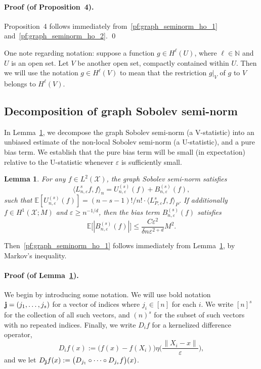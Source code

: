 \documentclass[aos]{imsart}
\theoremstyle{plain}
\newtheorem{lemma}{Lemma}
\theoremstyle{definition}
\theoremstyle{remark}
\newcommand{\dotp}[2]{\langle #1, #2 \rangle}
\newcommand{\mc}[1]{\mathcal{#1}}
\newcommand{\1}{\mathbf{1}}
\newcommand{\bj}{{\bf j}}
\newcommand{\restr}[2]{\ensuremath{\left.#1\right|_{#2}}}
\begin{document}
\paragraph{Proof (of Proposition~4).}
Proposition~4 follows immediately from~\eqref{pf:graph_seminorm_ho_1} and~\eqref{pf:graph_seminorm_ho_2}. \qed

One note regarding notation: suppose a function $g \in H^{\ell}(U)$, where $\ell \in \mathbb{N}$ and $U$ is an open set. Let $V$ be another open set, compactly contained within $U$. Then we will use the notation $g \in H^{\ell}(V)$ to mean that the restriction $\restr{g}{V}$ of $g$ to $V$ belongs to $H^{\ell}(V)$.

\subsection{Decomposition of graph Sobolev semi-norm}
\label{subsec:decomposition_graph_seminorm}

In Lemma~\ref{lem:graph_seminorm_bias}, we decompose the graph Sobolev semi-norm (a V-statistic) into an unbiased estimate of the non-local Sobolev semi-norm (a U-statistic), and a pure bias term. We establish that the pure bias term will be small (in expectation) relative to the U-statistic whenever $\varepsilon$ is sufficiently small.
\begin{lemma}
	\label{lem:graph_seminorm_bias}
	For any $f \in L^2(\mc{X})$, the graph Sobolev semi-norm satisfies
	\begin{equation}
	\label{eqn:graph_seminorm_bias_1}
	\dotp{L_{n,\varepsilon}^sf}{f}_{n} = U_{n,\varepsilon}^{(s)}(f) + B_{n,\varepsilon}^{(s)}(f),
	\end{equation}
	such that $\mathbb{E}[U_{n,\varepsilon}^{(s)}(f)] = (n - s - 1)!/n! \cdot \dotp{L_{P,\varepsilon}^sf}{f}_P$. If additionally $f \in H^1(\mc{X};M)$ and $\varepsilon \geq n^{-1/d}$, then the bias term $B_{n,\varepsilon}^{(s)}(f)$ satisfies
	\begin{equation}
	\label{eqn:graph_seminorm_bias_2}
	\mathbb{E}\bigl[|B_{n,\varepsilon}^{(s)}(f)|\bigr] \leq \frac{C\varepsilon^2}{\delta n\varepsilon^{2 + d}}M^2.
	\end{equation}
\end{lemma}
Then~\ref{pf:graph_seminorm_ho_1} follows immediately from Lemma~\ref{lem:graph_seminorm_bias}, by Markov's inequality.
\paragraph{Proof (of Lemma~\ref{lem:graph_seminorm_bias}).}
We begin by introducing some notation. We will use bold notation $\bj = (j_1,\ldots,j_s)$ for a vector of indices where $j_i \in [n]$ for each $i$. We write $[n]^s$ for the collection of all such vectors, and $(n)^s$ for the subset of such vectors with no repeated indices. Finally, we write $D_if$ for a kernelized difference operator,
\begin{equation*}
D_if(x) := \bigl(f(x) - f(X_i)\bigr) \eta\biggl(\frac{\|X_i - x\|}{\varepsilon}\biggr),
\end{equation*}
and we let $D_{\bj}f(x) := \bigl(D_{j_1}\circ \cdots \circ D_{j_s}f\bigr)(x)$.
\end{document}
